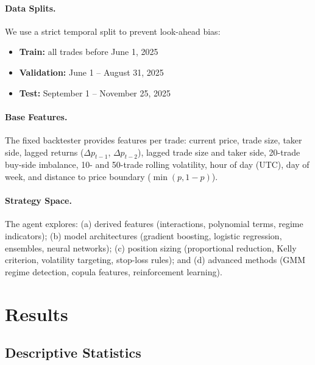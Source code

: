 \documentclass[11pt]{article}
\begin{document}
\paragraph{Data Splits.}
We use a strict temporal split to prevent look-ahead bias:
\begin{itemize}
    \item \textbf{Train:} all trades before June 1, 2025
    \item \textbf{Validation:} June 1 -- August 31, 2025
    \item \textbf{Test:} September 1 -- November 25, 2025
\end{itemize}

\paragraph{Base Features.}
The fixed backtester provides \NBaseFeatures{} features per trade: current price, trade size, taker side, lagged returns ($\Delta p_{t-1}$, $\Delta p_{t-2}$), lagged trade size and taker side, 20-trade buy-side imbalance, 10- and 50-trade rolling volatility, hour of day (UTC), day of week, and distance to price boundary ($\min(p, 1-p)$).

\paragraph{Strategy Space.}
The agent explores: (a) derived features (interactions, polynomial terms, regime indicators); (b) model architectures (gradient boosting, logistic regression, ensembles, neural networks); (c) position sizing (proportional reduction, Kelly criterion, volatility targeting, stop-loss rules); and (d) advanced methods (GMM regime detection, copula features, reinforcement learning).

\section{Results}
\label{sec:results}

\subsection{Descriptive Statistics}






\end{document}
